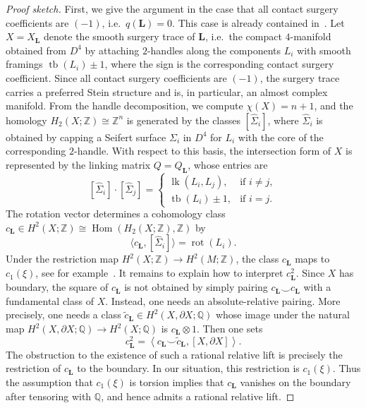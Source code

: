 \documentclass{amsart}
\numberwithin{equation}{section}
\numberwithin{figure}{section}
\theoremstyle{definition}
\theoremstyle{remark}
\DeclareMathOperator{\tb}{tb}
\DeclareMathOperator{\rot}{rot}
\DeclareMathOperator{\lk}{lk}
\newcommand{\Z}{\mathbb{Z}}
\let\oldSigma\Sigma
\renewcommand{\Sigma}{\oldSigma}
\let\olddxi\xi %
\renewcommand{\xi}{\olddxi}
\begin{document}
\begin{proof}[Proof sketch]
First, we give the argument in the case that all contact surgery coefficients are $(-1)$, i.e.\ $q(\boldsymbol{L})=0$. This case is already contained in~\cite{Gompf}. Let \(X=X_{\boldsymbol L}\) denote the smooth surgery trace of \(\boldsymbol L\), i.e.\ the compact $4$-manifold obtained from \(D^4\) by attaching \(2\)-handles along the components \(L_i\) with smooth framings \(\tb(L_i)\pm1\), where the sign is the corresponding contact surgery coefficient. Since all contact surgery coefficients are $(-1)$, the surgery trace carries a preferred Stein structure and is, in particular, an almost complex manifold. From the handle decomposition, we compute \(\chi(X)=n+1\), and the homology \(H_2(X;\mathbb Z)\cong\Z^n\) is generated by the classes \([\widehat{\Sigma}_i]\), where \(\widehat{\Sigma}_i\) is obtained by capping a Seifert surface \(\Sigma_i\) in $D^4$ for \(L_i\) with the core of the corresponding \(2\)-handle.
With respect to this basis, the intersection form of $X$ is represented by the linking matrix \(Q=Q_{\boldsymbol L}\), whose entries are
\[
[\widehat{\Sigma}_i]\cdot[\widehat{\Sigma}_j]=
   \begin{cases}
      \lk(L_i,L_j), & \text{if } i\neq j,\\
      \tb(L_i)\pm1, & \text{if } i=j.
   \end{cases}
\]
The rotation vector determines a cohomology class \(c_{\boldsymbol L}\in H^2(X;\mathbb Z)\cong \operatorname{Hom}(H_2(X;\mathbb Z),\mathbb Z)\) by
\[
\langle c_{\boldsymbol L},[\widehat{\Sigma}_i]\rangle=\rot(L_i).
\]
Under the restriction map \(H^2(X;\mathbb Z)\to H^2(M;\mathbb Z)\), the class \(c_{\boldsymbol L}\) maps to \(c_1(\xi)\), see for example~\cite{Ding_Geiges_Stipsicz}. 
It remains to explain how to interpret \(c_{\boldsymbol L}^2\). Since \(X\) has boundary, the square of \(c_{\boldsymbol L}\) is not obtained by simply pairing \(c_{\boldsymbol L}\smile c_{\boldsymbol L}\) with a fundamental class of \(X\). Instead, one needs an absolute-relative pairing. More precisely, one needs a class $\widetilde c_{\boldsymbol L}\in H^2(X,\partial X;\mathbb Q)$ whose image under the natural map \(H^2(X,\partial X;\mathbb Q)\to H^2(X;\mathbb Q)\) is \(c_{\boldsymbol L}\otimes 1\). Then one sets
\[
c_{\boldsymbol L}^2
=
\left\langle c_{\boldsymbol L}\smile \widetilde c_{\boldsymbol L},[X,\partial X]\right\rangle.
\]
The obstruction to the existence of such a rational relative lift is precisely the restriction of \(c_{\boldsymbol L}\) to the boundary. In our situation, this restriction is \(c_1(\xi)\). Thus the assumption that \(c_1(\xi)\) is torsion implies that \(c_{\boldsymbol L}\) vanishes on the boundary after tensoring with \(\mathbb Q\), and hence admits a rational relative lift.


\end{proof}
\end{document}
